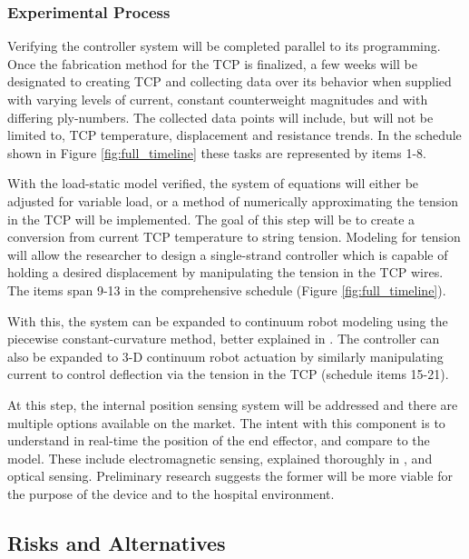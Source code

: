 	\subsubsection{Experimental Process}
	\label{sect:aim1_experimental_process}
	
		Verifying the controller system will be completed parallel to its programming. Once the fabrication method for the TCP is finalized, a few weeks will be designated to creating TCP and collecting data over its behavior when supplied with varying levels of current, constant counterweight magnitudes and with differing ply-numbers. The collected data points will include, but will not be limited to, TCP temperature, displacement and resistance trends. In the schedule shown in Figure \ref{fig:full_timeline} these tasks are represented by items 1-8.
		
		With the load-static model verified, the system of equations will either be adjusted for variable load, or a method of numerically approximating the tension in the TCP will be implemented. The goal of this step will be to create a conversion from current TCP temperature to string tension. Modeling for tension will allow the researcher to design a single-strand controller which is capable of holding a desired displacement by manipulating the tension in the TCP wires. The items span 9-13 in the comprehensive schedule (Figure \ref{fig:full_timeline}).
		
		With this, the system can be expanded to continuum robot modeling using the piecewise constant-curvature method, better explained in \cite{rao_how_2021}. The controller can also be expanded to 3-D continuum robot actuation by similarly manipulating current to control deflection via the tension in the TCP (schedule items 15-21).
		
		At this step, the internal position sensing system will be addressed and there are multiple options available on the market. The intent with this component is to understand in real-time the position of the end effector, and compare to the model. These include electromagnetic sensing, explained thoroughly in \cite{guo_continuum_2019}, and optical sensing. Preliminary research suggests the former will be more viable for the purpose of the device and to the hospital environment.

\subsection{Risks and Alternatives}

